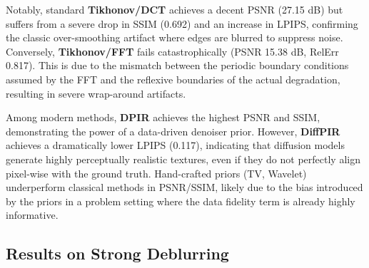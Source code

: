 \documentclass[12pt, a4paper, onecolumn]{article}
\theoremstyle{plain}          %
\theoremstyle{definition}     %
\theoremstyle{remark}
\begin{document}
Notably, standard \textbf{Tikhonov/DCT} achieves a decent PSNR (27.15 dB) but suffers from a severe drop in SSIM (0.692) and an increase in LPIPS, confirming the classic over-smoothing artifact where edges are blurred to suppress noise. Conversely, \textbf{Tikhonov/FFT} fails catastrophically (PSNR 15.38 dB, RelErr 0.817). This is due to the mismatch between the periodic boundary conditions assumed by the FFT and the reflexive boundaries of the actual degradation, resulting in severe wrap-around artifacts.

Among modern methods, \textbf{DPIR} achieves the highest PSNR and SSIM, demonstrating the power of a data-driven denoiser prior. However, \textbf{DiffPIR} achieves a dramatically lower LPIPS (0.117), indicating that diffusion models generate highly perceptually realistic textures, even if they do not perfectly align pixel-wise with the ground truth. Hand-crafted priors (TV, Wavelet) underperform classical methods in PSNR/SSIM, likely due to the bias introduced by the priors in a problem setting where the data fidelity term is already highly informative.

\subsection{Results on Strong Deblurring}
\label{sec:results_hard}
\end{document}
